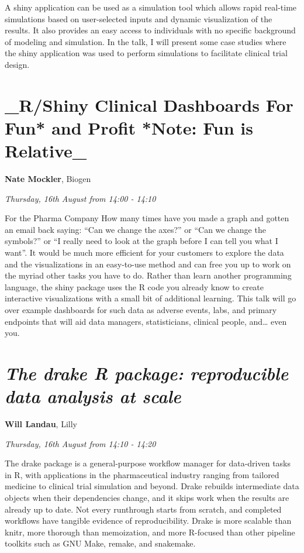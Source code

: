 \documentclass[]{book}
\theoremstyle{definition}
\theoremstyle{definition}
\theoremstyle{definition}
\theoremstyle{remark}
\begin{document}
A shiny application can be used as a simulation tool which allows rapid
real-time simulations based on user-selected inputs and dynamic
visualization of the results. It also provides an easy access to
individuals with no specific background of modeling and simulation. In
the talk, I will present some case studies where the shiny application
was used to perform simulations to facilitate clinical trial design.

\hypertarget{rshiny-clinical-dashboards-for-fun-and-profit-note-fun-is-relative_-1}{%
\section{\_R/Shiny Clinical Dashboards For Fun* and Profit *Note: Fun is
Relative\_}\label{rshiny-clinical-dashboards-for-fun-and-profit-note-fun-is-relative_-1}}

\textbf{Nate Mockler}, Biogen

\emph{Thursday, 16th August from 14:00 - 14:10}

For the Pharma Company How many times have you made a graph and gotten
an email back saying: ``Can we change the axes?'' or ``Can we change the
symbols?'' or ``I really need to look at the graph before I can tell you
what I want''. It would be much more efficient for your customers to
explore the data and the visualizations in an easy-to-use method and can
free you up to work on the myriad other tasks you have to do. Rather
than learn another programming language, the shiny package uses the R
code you already know to create interactive visualizations with a small
bit of additional learning. This talk will go over example dashboards
for such data as adverse events, labs, and primary endpoints that will
aid data managers, statisticians, clinical people, and\ldots{} even you.

\hypertarget{the-drake-r-package-reproducible-data-analysis-at-scale-1}{%
\section{\texorpdfstring{\emph{The drake R package: reproducible data
analysis at
scale}}{The drake R package: reproducible data analysis at scale}}\label{the-drake-r-package-reproducible-data-analysis-at-scale-1}}

\textbf{Will Landau}, Lilly

\emph{Thursday, 16th August from 14:10 - 14:20}

The drake package is a general-purpose workflow manager for data-driven
tasks in R, with applications in the pharmaceutical industry ranging
from tailored medicine to clinical trial simulation and beyond. Drake
rebuilds intermediate data objects when their dependencies change, and
it skips work when the results are already up to date. Not every
runthrough starts from scratch, and completed workflows have tangible
evidence of reproducibility. Drake is more scalable than knitr, more
thorough than memoization, and more R-focused than other pipeline
toolkits such as GNU Make, remake, and snakemake.
\end{document}
